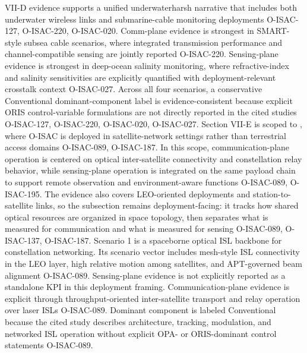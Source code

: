 {}\markdownRendererInterblockSeparator
{}\markdownRendererUlBeginTight
\markdownRendererUlItem VII-D evidence supports a unified underwater\markdownRendererUnderscore{}harsh narrative that includes both underwater wireless links and submarine-cable monitoring deployments O-ISAC-127, O-ISAC-220, O-ISAC-020.\markdownRendererUlItemEnd 
\markdownRendererUlItem Comm-plane evidence is strongest in SMART-style subsea cable scenarios, where integrated transmission performance and channel-compatible sensing are jointly reported O-ISAC-220.\markdownRendererUlItemEnd 
\markdownRendererUlItem Sensing-plane evidence is strongest in deep-ocean salinity monitoring, where refractive-index and salinity sensitivities are explicitly quantified with deployment-relevant crosstalk context O-ISAC-027.\markdownRendererUlItemEnd 
\markdownRendererUlItem Across all four scenarios, a conservative Conventional dominant-component label is evidence-consistent because explicit ORIS control-variable formulations are not directly reported in the cited studies O-ISAC-127, O-ISAC-220, O-ISAC-020, O-ISAC-027.\markdownRendererUlItemEnd 
\markdownRendererUlEndTight \markdownRendererInterblockSeparator
{}
\markdownRendererSectionEnd 
\markdownRendererSectionEnd \markdownRendererSectionBegin
{}\markdownRendererInterblockSeparator
{}\markdownRendererSectionBegin
{}\markdownRendererInterblockSeparator
{}Section VII-E is scoped to , where O-ISAC is deployed in satellite-network settings rather than terrestrial access domains O-ISAC-089, O-ISAC-187. In this scope, communication-plane operation is centered on optical inter-satellite connectivity and constellation relay behavior, while sensing-plane operation is integrated on the same payload chain to support remote observation and environment-aware functions O-ISAC-089, O-ISAC-195. The evidence also covers LEO-oriented deployments and station-to-satellite links, so the subsection remains deployment-facing: it tracks how shared optical resources are organized in space topology, then separates what is measured for communication and what is measured for sensing O-ISAC-089, O-ISAC-137, O-ISAC-187.\markdownRendererInterblockSeparator
{}
\markdownRendererSectionEnd \markdownRendererSectionBegin
{}\markdownRendererInterblockSeparator
{}Scenario 1 is a spaceborne optical ISL backbone for constellation networking. Its scenario vector includes mesh-style ISL connectivity in the LEO layer, high relative motion among satellites, and APT-governed beam alignment O-ISAC-089. Sensing-plane evidence is not explicitly reported as a standalone KPI in this deployment framing. Communication-plane evidence is explicit through throughput-oriented inter-satellite transport and relay operation over laser ISLs O-ISAC-089. Dominant component is labeled Conventional because the cited study describes architecture, tracking, modulation, and networked ISL operation without explicit OPA- or ORIS-dominant control statements O-ISAC-089.\markdownRendererParagraphSeparator
